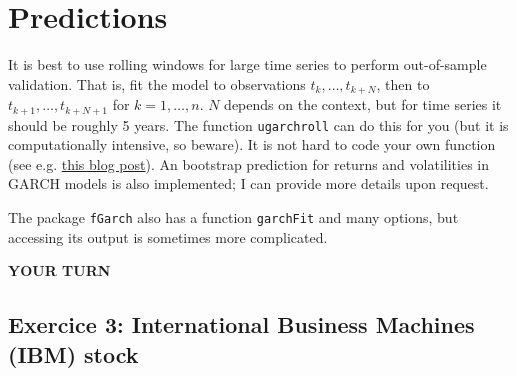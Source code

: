 \documentclass[]{book}
\newenvironment{Shaded}{\begin{snugshade}}{\end{snugshade}}
\newcommand{\KeywordTok}[1]{\textcolor[rgb]{0.13,0.29,0.53}{\textbf{#1}}}
\newcommand{\DataTypeTok}[1]{\textcolor[rgb]{0.13,0.29,0.53}{#1}}
\newcommand{\DecValTok}[1]{\textcolor[rgb]{0.00,0.00,0.81}{#1}}
\newcommand{\StringTok}[1]{\textcolor[rgb]{0.31,0.60,0.02}{#1}}
\newcommand{\CommentTok}[1]{\textcolor[rgb]{0.56,0.35,0.01}{\textit{#1}}}
\newcommand{\OtherTok}[1]{\textcolor[rgb]{0.56,0.35,0.01}{#1}}
\newcommand{\OperatorTok}[1]{\textcolor[rgb]{0.81,0.36,0.00}{\textbf{#1}}}
\newcommand{\NormalTok}[1]{#1}
\begin{document}
\section{Predictions}\label{predictions}

It is best to use rolling windows for large time series to perform
out-of-sample validation. That is, fit the model to observations
\(t_k, \ldots, t_{k+N}\), then to \(t_{k+1}, \ldots, t_{k+N+1}\) for
\(k=1, \ldots, n\). \(N\) depends on the context, but for time series it
should be roughly 5 years. The function \texttt{ugarchroll} can do this
for you (but it is computationally intensive, so beware). It is not hard
to code your own function (see e.g.
\href{http://unstarched.net/2012/12/26/rolling-garch-forecasts/}{this
blog post}). An bootstrap prediction for returns and volatilities in
GARCH models is also implemented; I can provide more details upon
request.

The package \texttt{fGarch} also has a function \texttt{garchFit} and
many options, but accessing its output is sometimes more complicated.

\begin{Shaded}
\end{Shaded}

\textbf{YOUR TURN}

\subsection{Exercice 3: International Business Machines (IBM)
stock}\label{exercice-3-international-business-machines-ibm-stock}
\end{document}
